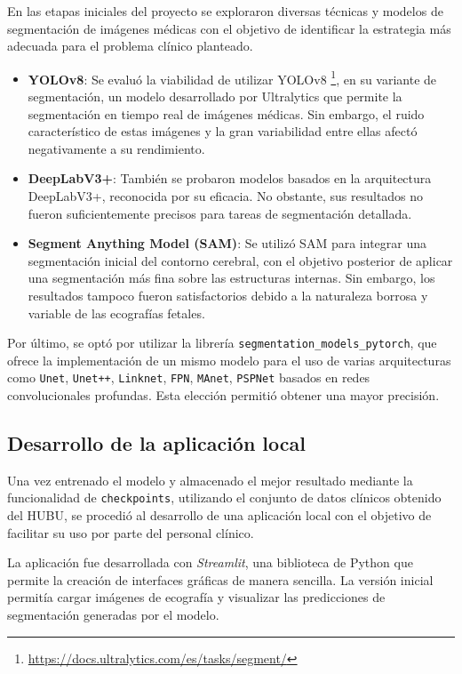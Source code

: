 En las etapas iniciales del proyecto se exploraron diversas técnicas y modelos de segmentación de imágenes médicas con el objetivo de identificar la estrategia más adecuada para el problema clínico planteado.
\begin{itemize}
    \item \textbf{YOLOv8}: Se evaluó la viabilidad de utilizar YOLOv8 \footnote{\url{https://docs.ultralytics.com/es/tasks/segment/}}, en su variante de segmentación, un modelo desarrollado por Ultralytics que permite la segmentación en tiempo real de imágenes médicas. Sin embargo, el ruido característico de estas imágenes y la gran variabilidad entre ellas afectó negativamente a su rendimiento.
    \item \textbf{DeepLabV3+}: También se probaron modelos basados en la arquitectura DeepLabV3+, reconocida por su eficacia. No obstante, sus resultados no fueron suficientemente precisos para tareas de segmentación detallada.
    \item \textbf{Segment Anything Model (SAM)}: Se utilizó SAM para integrar una segmentación inicial del contorno cerebral, con el objetivo posterior de aplicar una segmentación más fina sobre las estructuras internas. Sin embargo, los resultados tampoco fueron satisfactorios debido a la naturaleza borrosa y variable de las ecografías fetales.
\end{itemize}
Por último, se optó por utilizar la librería \texttt{segmentation\_models\_pytorch}, que ofrece la implementación de un mismo modelo para el uso de varias arquitecturas como \texttt{Unet}, \texttt{Unet++}, \texttt{Linknet}, \texttt{FPN}, \texttt{MAnet}, \texttt{PSPNet} basados en redes convolucionales profundas. Esta elección permitió obtener una mayor precisión.

\subsection{Desarrollo de la aplicación local}
Una vez entrenado el modelo y almacenado el mejor resultado mediante la funcionalidad de \texttt{checkpoints}, utilizando el conjunto de datos clínicos obtenido del HUBU, se procedió al desarrollo de una aplicación local con el objetivo de facilitar su uso por parte del personal clínico.

La aplicación fue desarrollada con \textit{Streamlit}, una biblioteca de Python que permite la creación de interfaces gráficas de manera sencilla. La versión inicial permitía cargar imágenes de ecografía y visualizar las predicciones de segmentación generadas por el modelo.

